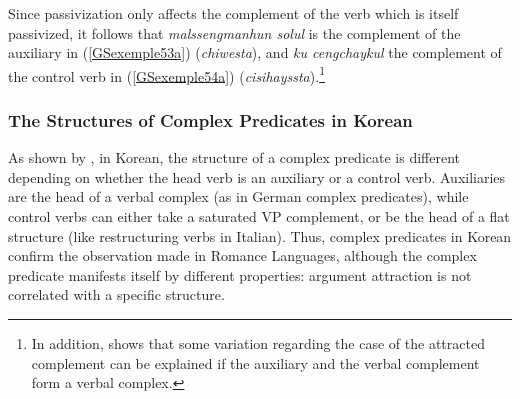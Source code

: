 \documentclass[output=paper]{langsci/langscibook}
\begin{document}
{\begin{exe}
\begin{xlist}
	    \label{GSexemple53b}
		\end{xlist}
\end{exe}


\begin{exe}
	\ex \label{GSexemple54} 
	\begin{xlist}
        \label{GSexemple54a}
		
	    \label{GSexemple54b}
		\end{xlist}
\end{exe}

Since passivization only affects the complement of the verb which is itself passivized, it follows that \textit{malssengmanhun solul} is the complement of the auxiliary in (\ref{GSexemple53a}) (\textit{chiwesta}), and \textit{ku cengchaykul} the complement of the control verb in (\ref{GSexemple54a}) (\textit{cisihayssta}).\footnote{In addition, \cite{Yoo2003} shows that some variation regarding the case of the attracted complement can be explained if the auxiliary and the verbal complement form a verbal complex.}

\subsubsection{The Structures of Complex Predicates in Korean}\label{GSsection4.2.2}
 
As shown by \cite{CC1998}, in Korean, the structure of a complex predicate is different depending on whether the head verb is an auxiliary or a control verb. Auxiliaries are the head of a verbal complex (as in German complex predicates), while control verbs can either take a saturated VP complement, or be the head of a flat structure (like restructuring verbs in Italian). Thus, complex predicates in Korean confirm the observation made in Romance Languages, although the complex predicate manifests itself by different properties: argument attraction is not correlated with a specific structure. 

}
\end{document}
